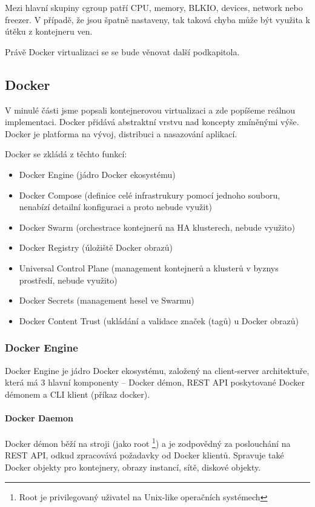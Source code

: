 \documentclass[thesis=M,czech]{FITthesis}[2019/12/23]
\theoremstyle{plain}
\theoremstyle{definition}
\begin{document}
Mezi hlavní skupiny cgroup patří CPU, memory, BLKIO, devices, network nebo freezer. V případě, že jsou špatně nastaveny, tak taková chyba může být využita k útěku z kontejneru ven. 


Právě Docker virtualizaci se se bude věnovat další podkapitola.

\subsection{Docker}

V minulé části jsme popsali kontejnerovou virtualizaci a zde popíšeme reálnou implementaci. Docker přidává abstraktní vrstvu nad koncepty zmíněnými výše. Docker je platforma na vývoj, distribuci a nasazování aplikací. 

Docker se zkládá z těchto funkcí:


\begin{itemize}  
\item Docker Engine (jádro Docker ekosystému)
\item Docker Compose (definice celé infrastrukury pomocí jednoho souboru, nenabízí detailní konfiguraci a proto nebude využit)
\item Docker Swarm (orchestrace kontejnerů na HA klusterech, nebude využito)
\item Docker Registry (úložiště Docker obrazů)
\item Universal Control Plane (management kontejnerů a klusterů v byznys prostředí, nebude využito)
\item Docker Secrets (management hesel ve Swarmu)
\item Docker Content Trust (ukládání a validace značek (tagů) u Docker obrazů)

\end{itemize}


\subsubsection{Docker Engine}

Docker Engine je jádro Docker ekosystému, založený na client-server architektuře, která má 3 hlavní komponenty -- Docker démon, REST API poskytované Docker démonem a CLI klient (příkaz docker).

\paragraph{Docker Daemon}

Docker démon běží na stroji (jako root \footnote{Root je privilegovaný uživatel na Unix-like operačních systémech}) a je zodpovědný za poslouchání na REST API, odkud zpracovává požadavky od Docker klientů. Spravuje také Docker objekty pro kontejnery, obrazy instancí, sítě, diskové objekty.
\end{document}
